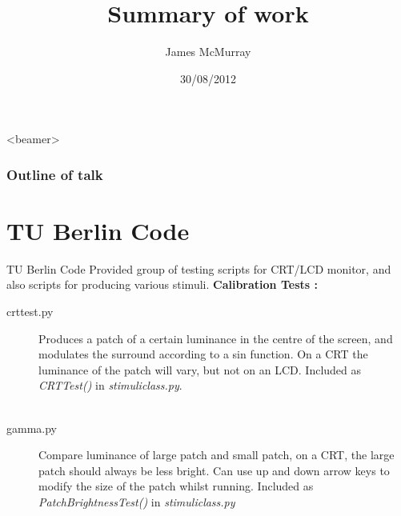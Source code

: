 \documentclass{beamer}
\title[Summary of work]{Summary of work}
\author{James McMurray}
\institute{Supervisor: Nora Umbach\\Department of Psychology\\Eberhard-Karls Universit\"{a}t T\"{u}bingen}
\date{30/08/2012}
\begin{document}

\begin{frame}
\titlepage
\end{frame}

  \begin{frame}<beamer>
    \frametitle{Outline of talk}
    \tableofcontents
  \end{frame}


\section{TU Berlin Code}
\begin{frame}[t]{TU Berlin Code}
Provided group of testing scripts for CRT/LCD monitor, and also scripts for producing various stimuli. {\bf Calibration Tests :}
\begin{description}
\item[crttest.py] Produces a \alert{patch of a certain luminance} in the centre of the screen, and \alert{modulates the surround} according to a \alert{sin function}. On a CRT the luminance of the patch will vary, but not on an LCD. Included as {\it CRTTest()} in {\it stimuliclass.py}.\\
~\\
\item[gamma.py] Compare luminance of large patch and small patch, on a CRT, the large patch should always be less bright. Can use up and down arrow keys to modify the size of the patch whilst running. Included as {\it PatchBrightnessTest()} in {\it stimuliclass.py}
\end{description}

\end{frame}
\end{document}
